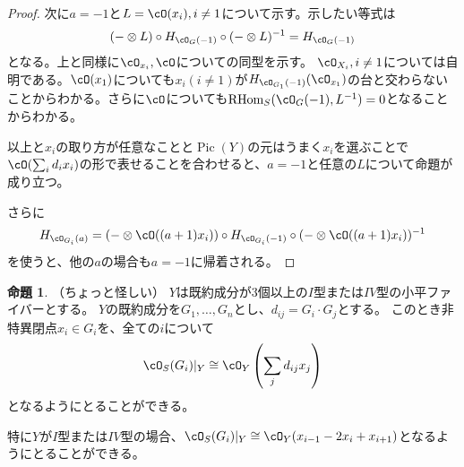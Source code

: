 \documentclass[uplatex, a4paper, dvipdfmx]{jsarticle}
\theoremstyle{definition}
\newtheorem{proposition}[theorem]{命題}
\DeclareMathOperator{\Pic}{\mathrm{Pic}}
\DeclareMathOperator{\RHom}{\mathrm{RHom}}
\begin{document}
\begin{proof}
    次に$a=-1$と$L = \cO(x_i), i \neq 1$について示す。示したい等式は
    \begin{equation}
        (-\otimes L) \circ H_{\cO_G(-1)} \circ(- \otimes L)^{-1} = H_{\cO_G(-1)}
    \end{equation}
    となる。上と同様に$\cO_{x_i}, \cO$についての同型を示す。
    $\cO_{X_i}, i \neq 1$については自明である。$\cO(x_1)$についても$x_i (i \neq 1)$が$H_{\cO_{G_1}(-1)}(\cO_{x_1})$の台と交わらないことからわかる。さらに$\cO$についても$\RHom_S(\cO_G(-1), L^{-1}) = 0$となることからわかる。

    以上と$x_i$の取り方が任意なことと$\Pic(Y)$の元はうまく$x_i$を選ぶことで$\cO(\sum_{i}d_ix_i)$の形で表せることを合わせると、$a = -1$と任意の$L$について命題が成り立つ。

    さらに
    \begin{equation}
        H_{\cO_{G_i}(a)} = (- \otimes \cO((a+1)x_i))\circ H_{\cO_{G_i}(-1)} \circ (- \otimes \cO((a+1)x_i))^{-1}
    \end{equation}
    を使うと、他の$a$の場合も$a = -1$に帰着される。
\end{proof}
\begin{proposition}\label{choice_of_x_i}
    （ちょっと怪しい）
    $Y$は既約成分が3個以上の$I$型または$IV$型の小平ファイバーとする。
    $Y$の既約成分を$G_1, \dots, G_n$とし、$d_{ij} = G_i \cdot G_j$とする。
    このとき非特異閉点$x_i \in G_i$を、全ての$i$について
    \begin{equation}
        \cO_S(G_i)\vert_Y \cong \cO_Y\left(\sum_j d_{ij}x_j\right)
    \end{equation}
    となるようにとることができる。

    特に$Y$が$I$型または$IV$型の場合、$\cO_S(G_i)\vert_Y \cong \cO_Y(x_{i-1} - 2x_i + x_{i+1})$となるようにとることができる。
\end{proposition}
\end{document}
